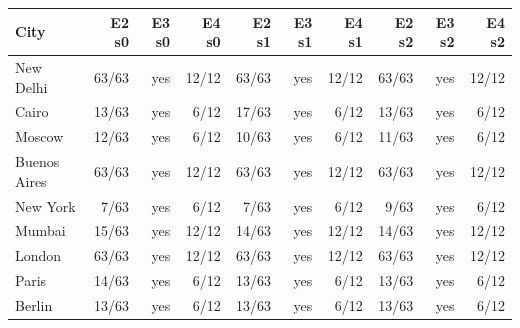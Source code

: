 \begin{tabular}{lrrrrrrrrr}
\toprule
City & E2 s0 & E3 s0 & E4 s0 & E2 s1 & E3 s1 & E4 s1 & E2 s2 & E3 s2 & E4 s2 \\
\midrule
New Delhi & 63/63 & yes & 12/12 & 63/63 & yes & 12/12 & 63/63 & yes & 12/12 \\
Cairo & 13/63 & yes & 6/12 & 17/63 & yes & 6/12 & 13/63 & yes & 6/12 \\
Moscow & 12/63 & yes & 6/12 & 10/63 & yes & 6/12 & 11/63 & yes & 6/12 \\
Buenos Aires & 63/63 & yes & 12/12 & 63/63 & yes & 12/12 & 63/63 & yes & 12/12 \\
New York & 7/63 & yes & 6/12 & 7/63 & yes & 6/12 & 9/63 & yes & 6/12 \\
Mumbai & 15/63 & yes & 12/12 & 14/63 & yes & 12/12 & 14/63 & yes & 12/12 \\
London & 63/63 & yes & 12/12 & 63/63 & yes & 12/12 & 63/63 & yes & 12/12 \\
Paris & 14/63 & yes & 6/12 & 13/63 & yes & 6/12 & 13/63 & yes & 6/12 \\
Berlin & 13/63 & yes & 6/12 & 13/63 & yes & 6/12 & 13/63 & yes & 6/12 \\
\bottomrule
\end{tabular}
